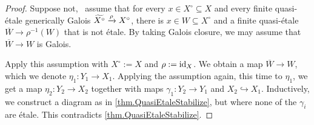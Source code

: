\documentclass[12pt]{amsart}
\numberwithin{equation}{theorem}
\renewcommand{\:}{\colon}
\theoremstyle{theorem}
\begin{document}
\begin{proof}
Suppose not, \ie~assume that for every $x \in X^\circ \subseteq X$ and every finite quasi-\'etale generically Galois $\widetilde{X^\circ} \xrightarrow\rho X^\circ$, there is $x \in W \subseteq X^\circ$ and a finite quasi-\'etale $\overline W \to \rho^{-1}(W)$ that is not \'etale.
By taking Galois closure, we may assume that $\overline W \to W$ is Galois.

Apply this assumption with $X^\circ := X$ and $\rho := \operatorname{{id}}_X$.
We obtain a map $\overline W \to W$, which we denote $\eta_1\colon Y_1 \to X_1$.
Applying the assumption again, this time to $\eta_1$, we get a map $\eta_2\colon Y_2 \to X_2$ together with maps $\gamma_1\colon Y_2 \to Y_1$ and $X_2 \hookrightarrow X_1$.
Inductively, we construct a diagram as in \autoref{thm.QuasiEtaleStabilize}, but where none of the $\gamma_i$ are \'etale.
This contradicts \autoref{thm.QuasiEtaleStabilize}.

\end{proof}
\end{document}
